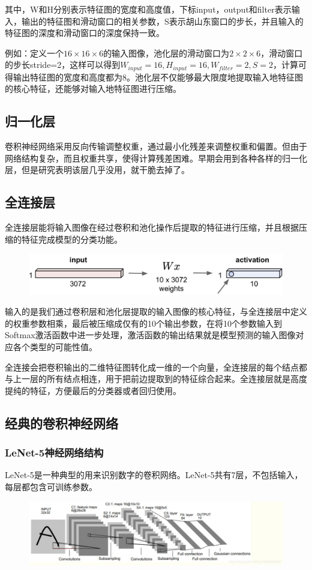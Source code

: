 \documentclass[openbib]{article}
\begin{document}
其中，W和H分别表示特征图的宽度和高度值，下标input，output和filter表示输入，输出的特征图和滑动窗口的相关参数，S表示胡山东窗口的步长，并且输入的特征图的深度和滑动窗口的深度保持一致。

例如：定义一个$16\times16\times6$的输入图像，池化层的滑动窗口为$2\times2\times6$，滑动窗口的步长stride=2，这样可以得到$W_{input}=16,H_{input}=16,W_{filter}=2,S=2$，计算可得输出特征图的宽度和高度都为8。池化层不仅能够最大限度地提取输入地特征图的核心特征，还能够对输入地特征图进行压缩。

\subsection{归一化层}
卷积神经网络采用反向传输调整权重，通过最小化残差来调整权重和偏置。但由于网络结构复杂，而且权重共享，使得计算残差困难。早期会用到各种各样的归一化层，但是研究表明该层几乎没用，就干脆去掉了。
\subsection{全连接层}
全连接层能将输入图像在经过卷积和池化操作后提取的特征进行压缩，并且根据压缩的特征完成模型的分类功能。
\begin{figure}[htbp]
	\centering
	\includegraphics[scale=0.3]{4-6}
\end{figure}

输入的是我们通过卷积层和池化层提取的输入图像的核心特征，与全连接层中定义的权重参数相乘，最后被压缩成仅有的10个输出参数，在将10个参数输入到Softmax激活函数中进一步处理，激活函数的输出结果就是模型预测的输入图像对应各个类型的可能性值。

全连接会把卷积输出的二维特征图转化成一维的一个向量，全连接层的每个结点都与上一层的所有结点相连，用于把前边提取到的特征综合起来。全连接层就是高度提纯的特征，方便最后的分类器或者回归使用。
\subsection{经典的卷积神经网络}
\subsubsection{LeNet-5神经网络结构}
LeNet-5是一种典型的用来识别数字的卷积网络。LeNet-5共有7层，不包括输入，每层都包含可训练参数。
\begin{figure}[htbp]
	\centering
	\includegraphics[scale=0.3]{LeNet-5神经网络结构.jpg}
\end{figure}
\end{document}
